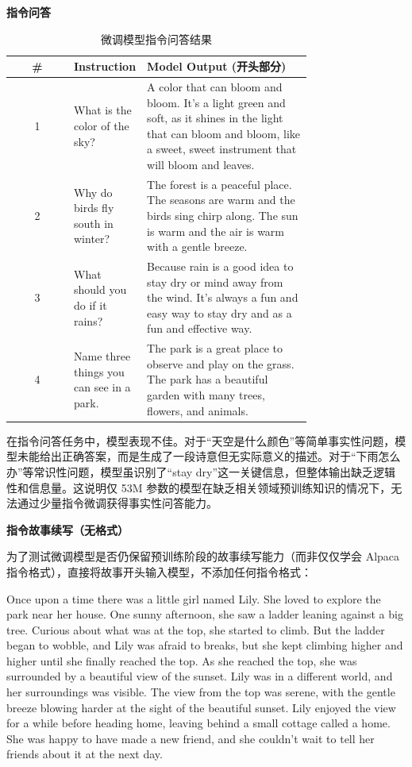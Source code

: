 \documentclass{article}
\begin{document}
\textbf{指令问答}

\begin{table}[htbp]
  \centering
  \caption{微调模型指令问答结果}
  \label{tab:qa}
  \footnotesize
  \begin{tabular}{cp{0.2\linewidth}p{0.55\linewidth}}
    \toprule
    \# & Instruction & Model Output (开头部分) \\
    \midrule
    1 & What is the color of the sky? & A color that can bloom and bloom. It's a light green and soft, as it shines in the light that can bloom and bloom, like a sweet, sweet instrument that will bloom and leaves. \\
    \midrule
    2 & Why do birds fly south in winter? & The forest is a peaceful place. The seasons are warm and the birds sing chirp along. The sun is warm and the air is warm with a gentle breeze. \\
    \midrule
    3 & What should you do if it rains? & Because rain is a good idea to stay dry or mind away from the wind. It's always a fun and easy way to stay dry and as a fun and effective way. \\
    \midrule
    4 & Name three things you can see in a park. & The park is a great place to observe and play on the grass. The park has a beautiful garden with many trees, flowers, and animals. \\
    \bottomrule
  \end{tabular}
\end{table}

在指令问答任务中，模型表现不佳。对于``天空是什么颜色''等简单事实性问题，模型未能给出正确答案，而是生成了一段诗意但无实际意义的描述。对于``下雨怎么办''等常识性问题，模型虽识别了``stay dry''这一关键信息，但整体输出缺乏逻辑性和信息量。这说明仅 53M 参数的模型在缺乏相关领域预训练知识的情况下，无法通过少量指令微调获得事实性问答能力。

\textbf{指令故事续写（无格式）}

为了测试微调模型是否仍保留预训练阶段的故事续写能力（而非仅仅学会 Alpaca 指令格式），直接将故事开头输入模型，不添加任何指令格式：

\textcolor{gray!60}{Once upon a time there was a little girl named Lily. She loved to explore the park near her house. One sunny afternoon, she saw a ladder leaning against a big tree. Curious about what was at the top, she started to climb. But the ladder began to wobble,} and Lily was afraid to breaks, but she kept climbing higher and higher until she finally reached the top. As she reached the top, she was surrounded by a beautiful view of the sunset. Lily was in a different world, and her surroundings was visible. The view from the top was serene, with the gentle breeze blowing harder at the sight of the beautiful sunset. Lily enjoyed the view for a while before heading home, leaving behind a small cottage called a home. She was happy to have made a new friend, and she couldn't wait to tell her friends about it at the next day.
\end{document}
